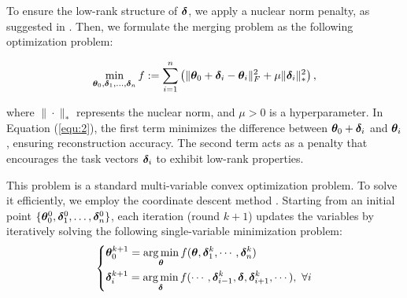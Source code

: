 
To ensure the low-rank structure of $\bm{\delta}$, we apply a nuclear norm penalty, as suggested in \citet{cai_2008_singular}. Then, we formulate the merging problem as the following optimization problem:

\begin{equation} \label{equ:2}
\min_{\bm{\theta}_0, \bm{\delta}_1, \dots, \bm{\delta}_n} f := \sum_{i=1}^n \left( \| \bm{\theta}_0 + \bm{\delta}_i - \bm{\theta}_i \|_F^2 + \mu \| \bm{\delta}_i \|_*^2 \right),
\end{equation}

where $\| \cdot \|_*$ represents the nuclear norm, and $\mu > 0$ is a hyperparameter.
In Equation (\ref{equ:2}), the first term minimizes the difference between $\bm{\theta}_0 + \bm{\delta}_i$ and $\bm{\theta}_i$, ensuring reconstruction accuracy. The second term acts as a penalty that encourages the task vectors $\bm{\delta}_i$ to exhibit low-rank properties.

This problem is a standard multi-variable convex optimization problem. To solve it efficiently, we employ the coordinate descent method \citep{wright_2015_coordinate}.
Starting from an initial point $\{ \bm{\theta}_0^0, \bm{\delta}_1^0, \dots, \bm{\delta}_n^0 \}$, each iteration (round $k+1$) updates the variables by iteratively solving the following single-variable minimization problem:
\begin{equation} \label{equ:3}
\begin{dcases}
\bm{\theta}_0^{k+1} = \mathop{\arg\min}_{\bm{\theta}} f(\bm{\theta}, \bm{\delta}_1^k ,\cdots, \bm{\delta}_n^k) \\ 
\bm{\delta}_i^{k+1} = \mathop{\arg\min}_{\bm{\delta}} f(\cdots, \bm{\delta}_{i-1}^k, \bm{\delta}, \bm{\delta}_{i+1}^k, \cdots), ~ \forall i
\end{dcases}
\end{equation}

